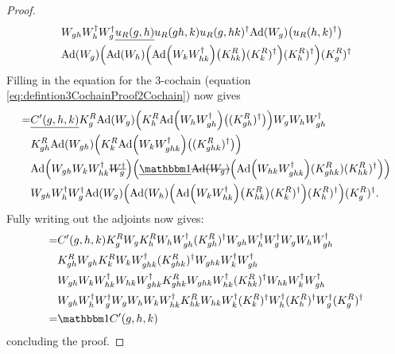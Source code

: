 \documentclass[11pt,a4paper,twoside]{article}
\numberwithin{equation}{section}
\begin{document}
\begin{proof}
\begin{align}
			\nonumber
			&W_{gh}W_h^\dagger W_g^\dagger \underline{u_R(g,h)} u_R(gh,k)u_R(g,hk)^\dagger\Ad{W_g}\left(u_R(h,k)^\dagger\right)\\
			\nonumber
			&\Ad{W_g}\left(\Ad{W_h}\left(\Ad{W_kW_{hk}^\dagger}\left(K_{hk}^R\right)(K^R_k)^\dagger\right)(K^R_h)^\dagger\right)(K^R_g)^\dagger
		\end{align}
		Filling in the equation for the 3-cochain (equation \eqref{eq:defintion3CochainProof2Cochain}) now gives
		\begin{align}
			=&\underline{C'(g,h,k)}K_g^R\Ad{W_g}\left(K_h^R\Ad{W_hW_{gh}^\dagger}\left((K_{gh}^R)^\dagger\right)\right)W_gW_hW_{gh}^\dagger \\
			\nonumber
			&K_{gh}^R\Ad{W_{gh}}\left(K_k^R\Ad{W_kW_{ghk}^\dagger}\left((K_{ghk}^R)^\dagger\right)\right)\\
			\nonumber
			&\Ad{W_{gh}W_kW_{hk}^\dagger \stkout{W_{g}^\dagger}}  \left(\underline{\id}\stkout{\Ad{W_g}}\left( \Ad{W_{hk}W_{ghk}^\dagger}(K^R_{ghk})(K^R_{hk})^{\dagger} \right)\right)\\
			\nonumber
			&W_{gh}W_h^\dagger W_g^\dagger\Ad{W_g}\left(\Ad{W_h}\left(\Ad{W_kW_{hk}^\dagger}\left(K_{hk}^R\right)(K^R_k)^\dagger\right)(K^R_h)^\dagger\right)(K^R_g)^\dagger.
		\end{align}
		Fully writing out the adjoints now gives:
		\begin{align}
			=&C'(g,h,k)K_g^RW_gK_h^RW_hW_{gh}^\dagger (K_{gh}^R)^\dagger W_{gh}W_h^\dagger W_g^\dagger W_gW_hW_{gh}^\dagger \\
			\nonumber
			&K_{gh}^RW_{gh}K_k^RW_kW_{ghk}^\dagger(K_{ghk}^R)^\dagger W_{ghk}W_k^\dagger W_{gh}^\dagger  \\
			\nonumber
			&W_{gh}W_kW_{hk}^\dagger W_{hk}W_{ghk}^\dagger K^R_{ghk} W_{ghk}W_{hk}^\dagger(K^R_{hk})^{\dagger} W_{hk}W_k^\dagger W_{gh}^\dagger\\
			\nonumber
			&W_{gh}W_h^\dagger W_g^\dagger W_gW_h W_kW_{hk}^\dagger K_{hk}^RW_{hk}W_k^\dagger(K^R_k)^\dagger W_h^\dagger (K^R_h)^\dagger W_g^\dagger (K^R_g)^\dagger\\
			=&\id C'(g,h,k)
		\end{align}
		concluding the proof.
	\end{proof}
\end{document}
